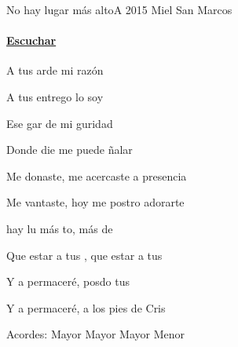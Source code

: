 \documentclass[12pt, spanish]{book}
\begin{document}
    \begin{song}{No hay lugar más alto}{A}
        {2015} %
        {Miel San Marcos}
        {} %
        {}
        \ifChordBk
        \paragraph{\mbox{}\hfill\protect\href{https://open.spotify.com/intl-es/track/0yzKJqFTXsbzWjUHaiOxD9}{Escuchar}\mbox{}\hfill}
        \fi



        \begin{SBOpGroup}
            A tus  arde mi razón

            A tus  entrego lo  soy

            Ese gar de mi guridad

            Donde die me puede ñalar
        \end{SBOpGroup}

        \begin{SBOpGroup}
            Me donaste, me acercaste a  presencia

            Me vantaste, hoy me postro  adorarte
        \end{SBOpGroup}

        \begin{SBChorus}
             hay lu más to, más de

            Que estar a tus , que estar a tus 
        \end{SBChorus}

        \begin{SBOpGroup}
            Y a permaceré, posdo  tus 

            Y a permaceré, a los pies de Cris
        \end{SBOpGroup}

        \ifChordBk
        \begin{SBOpGroup}
            Acordes:
             Mayor \hfill
             Mayor \hfill\null\break
             Mayor \hfill
             Menor \hfill\null\break
        \end{SBOpGroup}
        \fi
    \end{song}
\end{document}

